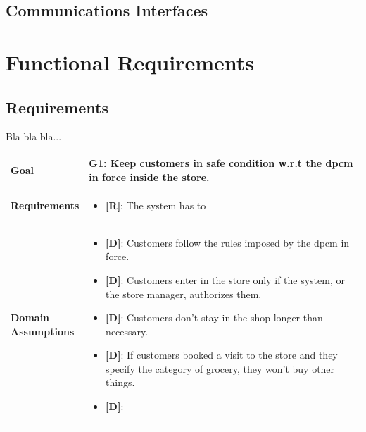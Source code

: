 \subsection{Communications Interfaces}

\section{Functional Requirements}

\subsection{Requirements}

Bla bla bla...

\begin{table}[H]
\centering
\begin{tabular}{| m{} | m{} |} 
	\hline
	\textbf{Goal} &
		\textbf{G1: Keep customers in safe condition w.r.t the \gls{dpcm} in force inside the store.} \\
	\hline
	\textbf{Requirements} &
		\begin{itemize}
			\item {\textbf{[R]}}: The system has to
		\end{itemize} \\ 
	\hline
	\shortstack[l]{\textbf{Domain} \\ \textbf{Assumptions}} & 
		\begin{itemize}
			\item {\textbf{[D]}}: Customers follow the rules imposed by the \gls{dpcm} in force.
			\item {\textbf{[D]}}: Customers enter in the store only if the system, or the store manager, authorizes them.
			\item {\textbf{[D]}}: Customers don't stay in the shop longer than necessary.
			\item {\textbf{[D]}}: If customers booked a visit to the store and they specify the category of grocery, they won't buy other things.
			\item {\textbf{[D]}}: 
		\end{itemize} \\ 
	\hline
\end{tabular}
\end{table}

